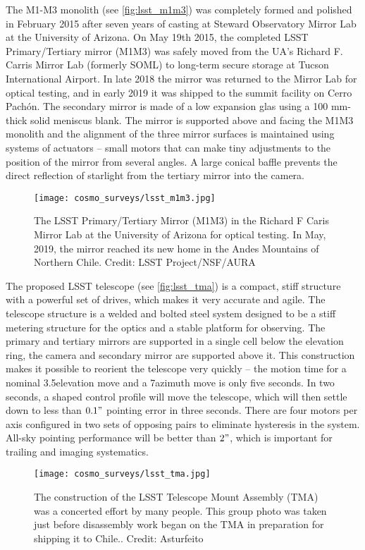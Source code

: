 The M1-M3 monolith (see \autoref{fig:lsst_m1m3}) was completely formed and polished in February 2015 after seven years of casting at Steward Observatory Mirror Lab at the University of Arizona. On May 19th 2015, the completed LSST Primary/Tertiary mirror (M1M3) was safely moved from the UA's Richard F. Carris Mirror Lab (formerly SOML) to long-term secure storage at Tucson International Airport. In late 2018 the mirror was returned to the Mirror Lab for optical testing, and in early 2019 it was shipped to the summit facility on Cerro Pach\'{o}n. The secondary mirror is made of a low expansion glas using a 100 mm-thick solid meniscus blank. The mirror is supported above and facing the M1M3 monolith and the alignment of the three mirror surfaces is maintained using systems of actuators -- small motors that can make tiny adjustments to the position of the mirror from several angles. A large conical baffle prevents the direct reflection of starlight from the tertiary mirror into the camera.
\begin{figure}[ht]
    \centering
    \texttt{[image: cosmo\_surveys/lsst\_m1m3.jpg]}
    \caption{The LSST Primary/Tertiary Mirror (M1M3) in the Richard F Caris Mirror Lab at the University of Arizona for optical testing. In May, 2019, the mirror reached its new home in the Andes Mountains of Northern Chile. Credit: LSST Project/NSF/AURA}
    \label{fig:lsst_m1m3}
\end{figure}

The proposed LSST telescope (see \autoref{fig:lsst_tma}) is a compact, stiff structure with a powerful set of drives, which makes it very accurate and agile. The telescope structure is a welded and bolted steel system designed to be a stiff metering structure for the optics and a stable platform for observing. The primary and tertiary mirrors are supported in a single cell below the elevation ring, the camera and secondary mirror are supported above it. This construction makes it possible to reorient the telescope very quickly -- the motion time for a nominal 3.5\textdegree elevation move and a 7\textdegree azimuth move is only five seconds. In two seconds, a shaped control profile will move the telescope, which will then settle down to less than $0.1"$ pointing error in three seconds. There are four motors per axis configured in two sets of opposing pairs to eliminate hysteresis in the system. All-sky pointing performance will be better than $2"$, which is important for trailing and imaging systematics.
\begin{figure}[ht]
    \centering
    \texttt{[image: cosmo\_surveys/lsst\_tma.jpg]}
    \caption{The construction of the LSST Telescope Mount Assembly (TMA) was a concerted effort by many people. This group photo was taken just before disassembly work began on the TMA in preparation for shipping it to Chile.. Credit: Asturfeito}
    \label{fig:lsst_tma}
\end{figure}

